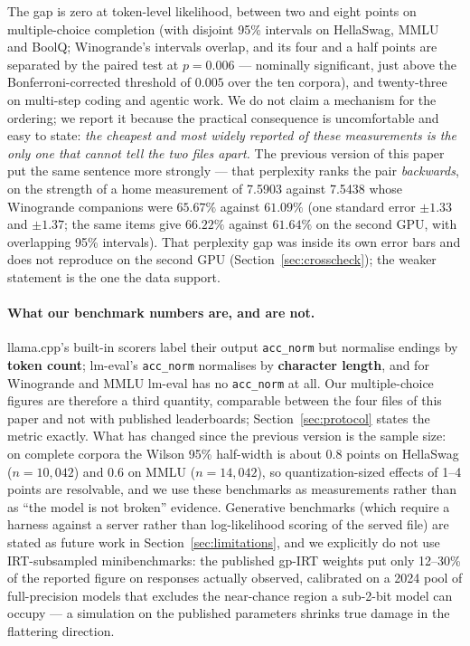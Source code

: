 \documentclass[10pt]{article} %
\begin{document}
The gap is zero at token-level likelihood, between two and eight points on
multiple-choice completion (with disjoint 95\% intervals on HellaSwag, MMLU
and BoolQ; Winogrande's intervals overlap, and its four and a half points are
separated by the paired test at $p = 0.006$ --- nominally significant, just
above the Bonferroni-corrected threshold of $0.005$ over the ten corpora),
and twenty-three on multi-step coding and
agentic work. We do not claim a mechanism for the ordering; we report it
because the practical consequence is uncomfortable and easy to state:
\emph{the cheapest and most widely reported of these measurements is the only
one that cannot tell the two files apart.} The previous version of this paper
put the same sentence more strongly --- that perplexity ranks the pair
\emph{backwards}, on the strength of a home measurement of 7.5903 against
7.5438 whose Winogrande companions were $65.67\%$ against $61.09\%$
(one standard error $\pm 1.33$ and $\pm 1.37$; the same items give
$66.22\%$ against $61.64\%$ on the second GPU, with overlapping 95\%
intervals). That perplexity gap was inside its own
error bars and does not reproduce on the second GPU
(Section~\ref{sec:crosscheck}); the weaker statement is the one the data
support.

\paragraph{What our benchmark numbers are, and are not.} llama.cpp's built-in
scorers label their output \texttt{acc\_norm} but normalise endings by
\textbf{token count}; lm-eval's \texttt{acc\_norm} normalises by
\textbf{character length}, and for Winogrande and MMLU lm-eval has no
\texttt{acc\_norm} at all. Our multiple-choice figures are therefore a third
quantity, comparable between the four files of this paper and not with
published leaderboards; Section~\ref{sec:protocol} states the metric exactly.
What has changed since the previous version is the sample size: on complete
corpora the Wilson 95\% half-width is about 0.8 points on HellaSwag
($n = 10{,}042$) and 0.6 on MMLU ($n = 14{,}042$), so quantization-sized
effects of 1--4 points are resolvable, and we use these benchmarks as
measurements rather than as ``the model is not broken'' evidence. Generative
benchmarks (which require a harness against a server rather than
log-likelihood scoring of the served file) are stated as future work in
Section~\ref{sec:limitations}, and we explicitly do not use IRT-subsampled
minibenchmarks: the published gp-IRT weights put only 12--30\% of the reported
figure on responses actually observed, calibrated on a 2024 pool of
full-precision models that excludes the near-chance region a sub-2-bit model
can occupy --- a simulation on the published parameters shrinks true damage in
the flattering direction.
\end{document}
